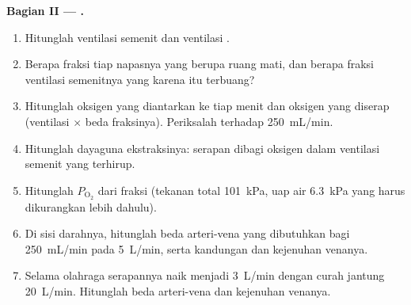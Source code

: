 \begin{problem}
\medskip
\noindent\textbf{Bagian II --- .}
\begin{enumerate}[resume]
  \item Hitunglah ventilasi semenit dan ventilasi .
  \item Berapa fraksi tiap napasnya yang berupa ruang mati, dan berapa
        fraksi ventilasi semenitnya yang karena itu terbuang?
  \item Hitunglah oksigen yang diantarkan ke  tiap menit
        dan oksigen yang diserap (ventilasi  $\times$ beda
        fraksinya). Periksalah terhadap \qty{250}{mL/min}.
  \item Hitunglah dayaguna ekstraksinya: serapan dibagi oksigen dalam
        ventilasi semenit yang terhirup.
  \item Hitunglah $P_{\mathrm{O_2}}$  dari fraksi
         (tekanan total \qty{101}{kPa}, uap air
        \qty{6.3}{kPa} yang harus dikurangkan lebih dahulu).
  \item Di sisi darahnya, hitunglah beda arteri-vena yang dibutuhkan
        bagi \qty{250}{mL/min} pada \qty{5}{L/min}, serta kandungan dan
        kejenuhan venanya.
  \item Selama olahraga serapannya naik menjadi \qty{3}{L/min} dengan
        curah jantung \qty{20}{L/min}. Hitunglah beda arteri-vena dan
        kejenuhan venanya.
\end{enumerate}


\end{problem}
